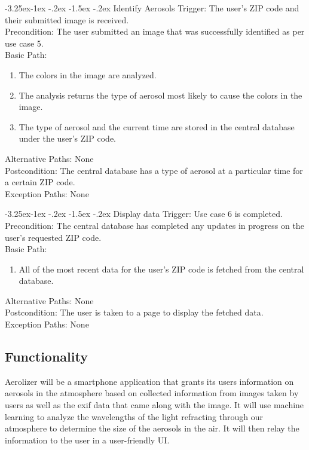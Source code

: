 \documentclass[journal,10pt,draftclsnofoot,onecolumn]{IEEEtran}
\makeatletter
\renewcommand\subsubsection{\@startsection{subsubsection}{3}{\z@}
                                     {-3.25ex\@plus -1ex \@minus -.2ex}
                                     {-1.5ex \@plus -.2ex}
                                     {\normalfont\normalsize\bfseries}}
\makeatother
\begin{document}
\begin{singlespace}
\begin{enumerate}
		\subsubsection{Identify Aerosols} 
			Trigger: The user's ZIP code and their submitted image is received.\\
			Precondition: The user submitted an image that was successfully identified as per use case 5.\\
			Basic Path:
			\begin{enumerate}
				\item The colors in the image are analyzed.
				\item The analysis returns the type of aerosol most likely to cause the colors in the image.
				\item The type of aerosol and the current time are stored in the central database under the user's ZIP code.
			\end{enumerate}
			Alternative Paths: None\\
			Postcondition: The central database has a type of aerosol at a particular time for a certain ZIP code.\\
			Exception Paths: None
		
		\subsubsection{Display data}
			Trigger: Use case 6 is completed.\\
			Precondition: The central database has completed any updates in progress on the user's requested ZIP code.\\
			Basic Path:
			\begin{enumerate}
				\item All of the most recent data for the user's ZIP code is fetched from the central database.
			\end{enumerate}
			Alternative Paths: None\\
			Postcondition: The user is taken to a page to display the fetched data.\\
			Exception Paths: None

	\subsection{Functionality}
		Aerolizer will be a smartphone application that grants its users information on aerosols in the atmosphere based on collected information from images taken by users as well as the exif data that came along with the image.
		It will use machine learning to analyze the wavelengths of the light refracting through our atmosphere to determine the size of the aerosols in the air. It will then relay the information to the user in a user-friendly UI. 


\end{enumerate}
\end{singlespace}
\end{document}
